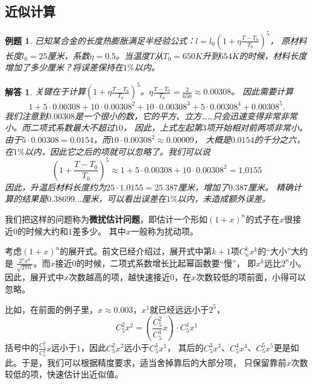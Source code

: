 \documentclass[12pt,UTF8]{ctexbook}
\newtheorem{et}{例题}[section]
\newtheorem*{so}{解答}
\begin{document}
\subsection{近似计算}
\begin{et}
    已知某合金的长度热膨胀满足半经验公式：$l = l_0(1+\eta\frac{T-T_0}{T_0})^5$，
    原材料长度$l_0=25$厘米，系数$\eta=0.5$。当温度$T$从$T_0=650K$升到$654K$的时候，材料长度增加了多少厘米？将误差保持在$1\%$以内。
\end{et}
\begin{so}
    关键在于计算$(1+\eta\frac{T-T_0}{T_0})^5$。$\eta\frac{T-T_0}{T_0} = \frac{2}{650} \approx 0.00308$。
    因此需要计算
    $$ 1 + 5\cdot 0.00308 + 10\cdot 0.00308^2 + 10 \cdot 0.00308^3 + 5 \cdot 0.00308^4 + 0.00308^5. $$
    我们注意到$0.00308$是一个很小的数，它的平方、立方……只会迅速变得非常非常小。而二项式系数最大不超过$10$，
    因此，上式左起第$3$项开始相对前两项非常小。\\
    由于$5 \cdot 0.00308 = 0.0154$，而$10\cdot 0.00308^2 \approx 0.00009$，
    大概是$0.0154$的千分之六，在$1\%$以内，因此它之后的项就可以忽略了。我们可以说
    $$ (1+\frac{T-T_0}{T_0})^5 \approx 1 + 5\cdot 0.00308 + 10\cdot 0.00308^2 = 1.0155 $$
    因此，升温后材料长度约为$25\cdot 1.0155 = 25.387$厘米，增加了$0.387$厘米。
    精确计算的结果是$0.38699\dots$厘米，可以看出误差在$1\%$以内，未造成额外误差。   
\end{so}

我们把这样的问题称为\textbf{微扰估计问题}，即估计一个形如$(1+x)^n$的式子在$x$很接近$0$的时候大约和$1$差多少。
其中$x$一般称为扰动项。

考虑$(1+x)^n$的展开式。前文已经介绍过，展开式中第$k+1$项$C_n^kx^k$的“大小”大约是
$\frac{2^{n}x^k}{\sqrt{2\pi n}}$。而$x$接近$0$的时候，二项式系数增长比起幂函数要“慢”，
即$x^k$远比$2^n$小。因此，展开式中$x$次数越高的项，越快速接近$0$，在$x$次数较低的项前面，小得可以忽略。

比如，在前面的例子里，$x\approx 0.003$，$x^1$就已经远远小于$2^5$，
$$C_5^2x^2 = \left(\frac{C_5^2}{C_5^1}x\right)\cdot C_5^1x^1$$
括号中的$\frac{C_5^2}{C_5^1}x$远小于$1$，因此$C_5^2x^2$远小于$C_5^1x^1$，
其后的$C_5^3x^3$、$C_5^4x^4$、$C_5^5x^5$更是如此。于是，我们可以根据精度要求，适当舍掉靠后的大部分项，
只保留靠前$x$次数较低的项，快速估计出近似值。
\end{document}
